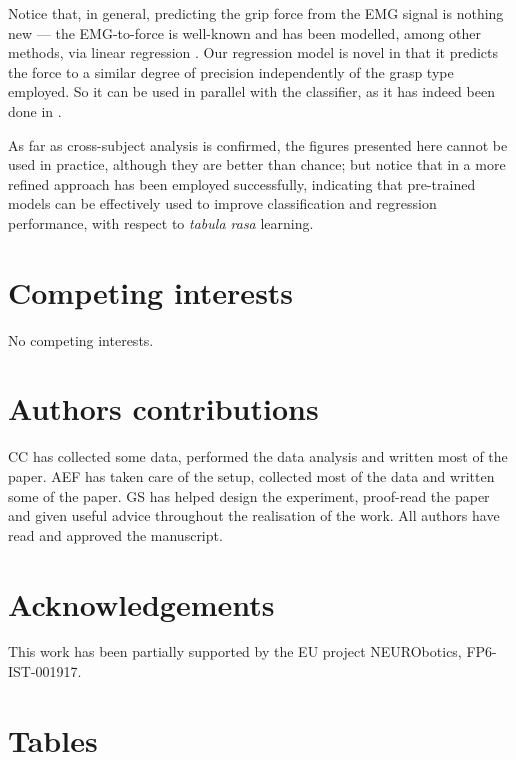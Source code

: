 \documentclass[10pt]{bmc_article}
\newenvironment{bmcformat}
  {\begin{raggedright}\baselineskip20pt\sloppy\setboolean{publ}{false}}
  {\end{raggedright}\baselineskip20pt\sloppy}
\begin{document}
\begin{bmcformat}
Notice that, in general, predicting the grip force from the EMG signal
is nothing new --- the EMG-to-force is well-known and has been modelled,
among other methods, via linear regression \cite{Hoozemans05}. Our regression model
is novel in that it predicts the force to a similar degree of precision
independently of the grasp type employed. So it can be used in parallel
with the classifier, as it has indeed been done in \cite{2008.BioCyb}.

As far as cross-subject analysis is confirmed, the figures presented here
cannot be used in practice, although they are better than chance; but notice
that in \cite{2009.ICRA} a more refined approach has been employed successfully,
indicating that pre-trained models can be effectively used to improve
classification and regression performance, with respect to \emph{tabula rasa}
learning.

\section*{Competing interests}

No competing interests.

\section*{Authors contributions}

CC has collected some data, performed the data analysis and written most of the
paper. AEF has taken care of the setup, collected most of the data and written
some of the paper. GS has helped design the experiment, proof-read the paper
and given useful advice throughout the realisation of the work. All authors
have read and approved the manuscript.

\section*{Acknowledgements}

This work has been partially supported by the EU project NEURObotics, FP6-IST-001917.

{
   }     %


\section*{Tables}


\end{bmcformat}
\end{document}
